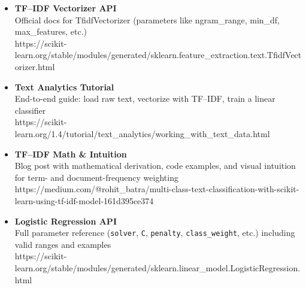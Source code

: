 \documentclass[
  letterpaper,
  DIV=11,
  numbers=noendperiod]{scrartcl}
\begin{document}
\begin{itemize}
\item
  \textbf{TF--IDF Vectorizer API}\\
  Official docs for TfidfVectorizer (parameters like ngram\_range,
  min\_df, max\_features, etc.)\\
  https://scikit-learn.org/stable/modules/generated/sklearn.feature\_extraction.text.TfidfVectorizer.html
\item
  \textbf{Text Analytics Tutorial}\\
  End-to-end guide: load raw text, vectorize with TF--IDF, train a
  linear classifier\\
  https://scikit-learn.org/1.4/tutorial/text\_analytics/working\_with\_text\_data.html
\item
  \textbf{TF--IDF Math \& Intuition}\\
  Blog post with mathematical derivation, code examples, and visual
  intuition for term- and document-frequency weighting\\
  https://medium.com/@rohit\_batra/multi-class-text-classification-with-scikit-learn-using-tf-idf-model-161d395ce374
\item
  \textbf{Logistic Regression API}\\
  Full parameter reference (\texttt{solver}, \texttt{C},
  \texttt{penalty}, \texttt{class\_weight}, etc.) including valid ranges
  and examples\\
  https://scikit-learn.org/stable/modules/generated/sklearn.linear\_model.LogisticRegression.html
\end{itemize}
\end{document}
